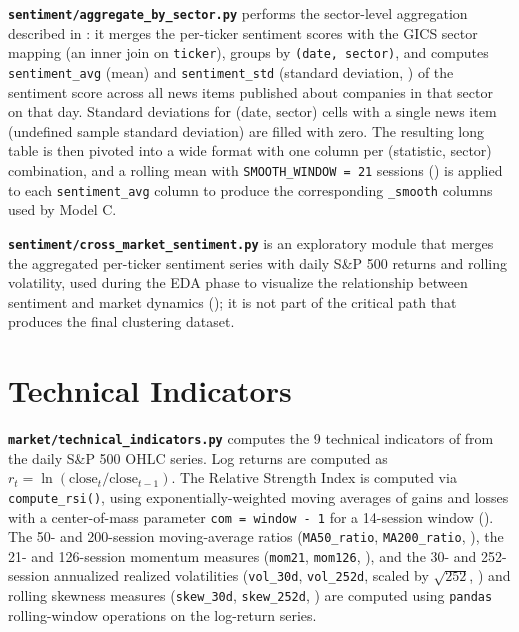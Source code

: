 \textbf{\texttt{sentiment/aggregate\_by\_sector.py}} performs the
sector-level aggregation described in : it
merges the per-ticker sentiment scores with the GICS sector mapping
(an inner join on \texttt{ticker}), groups by \texttt{(date, sector)}, and
computes \texttt{sentiment\_avg} (mean) and \texttt{sentiment\_std}
(standard deviation, ) of the sentiment
score across all news items published about companies in that sector on
that day. Standard deviations for (date, sector) cells with a single news
item (undefined sample standard deviation) are filled with zero. The
resulting long table is then pivoted into a wide format with one column
per (statistic, sector) combination, and a rolling mean with
\texttt{SMOOTH\_WINDOW = 21} sessions () is applied to
each \texttt{sentiment\_avg} column to produce the corresponding
\texttt{\_smooth} columns used by Model C.

\textbf{\texttt{sentiment/cross\_market\_sentiment.py}} is an exploratory
module that merges the aggregated per-ticker sentiment series with daily
S\&P 500 returns and rolling volatility, used during the EDA phase to
visualize the relationship between sentiment and market dynamics
(); it is not part of the critical path that produces the
final clustering dataset.

\section{Technical Indicators}
\label{annex:pipeline-technical}

\textbf{\texttt{market/technical\_indicators.py}} computes the 9 technical
indicators of  from the daily S\&P 500 OHLC
series. Log returns are computed as
$r_t = \ln(\text{close}_t / \text{close}_{t-1})$. The Relative Strength
Index is computed via \texttt{compute\_rsi()}, using exponentially-weighted
moving averages of gains and losses with a center-of-mass parameter
\texttt{com = window - 1} for a 14-session window
(). The 50- and 200-session moving-average ratios
(\texttt{MA50\_ratio}, \texttt{MA200\_ratio}, ), the
21- and 126-session momentum measures (\texttt{mom21}, \texttt{mom126},
), and the 30- and 252-session annualized realized
volatilities (\texttt{vol\_30d}, \texttt{vol\_252d}, scaled by
$\sqrt{252}$, ) and rolling skewness measures
(\texttt{skew\_30d}, \texttt{skew\_252d}, ) are computed
using \texttt{pandas} rolling-window operations on the log-return series.

